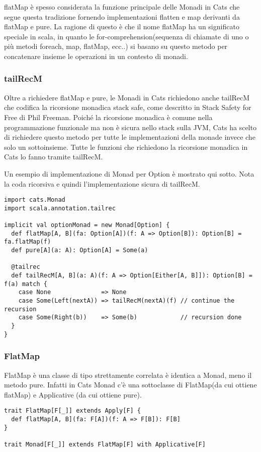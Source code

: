 \noindent flatMap è spesso considerata la funzione principale delle Monadi in Cats che segue questa tradizione fornendo implementazioni flatten e map derivanti da flatMap e pure. La ragione di questo è che il nome flatMap ha un significato speciale in scala, in quanto le for-comprehension(sequenza di chiamate di uno o più metodi foreach, map, flatMap, ecc..) si basano su questo metodo per concatenare insieme le operazioni in un contesto di monadi.

\subsubsection{tailRecM}
Oltre a richiedere flatMap e pure, le Monadi in Cats richiedono anche tailRecM che codifica la ricorsione monadica stack safe, come descritto in Stack Safety for Free di Phil Freeman. Poiché la ricorsione monadica è comune nella programmazione funzionale ma non è sicura nello stack sulla JVM, Cats ha scelto di richiedere questo metodo per tutte le implementazioni della monade invece che solo un sottoinsieme. Tutte le funzioni che richiedono la ricorsione monadica in Cats lo fanno tramite tailRecM.

Un esempio di implementazione di Monad per Option è mostrato qui sotto. Nota la coda ricorsiva e quindi l'implementazione sicura di tailRecM.
\begin{verbatim}
import cats.Monad
import scala.annotation.tailrec

implicit val optionMonad = new Monad[Option] {
  def flatMap[A, B](fa: Option[A])(f: A => Option[B]): Option[B] = fa.flatMap(f)
  def pure[A](a: A): Option[A] = Some(a)

  @tailrec
  def tailRecM[A, B](a: A)(f: A => Option[Either[A, B]]): Option[B] = f(a) match {
    case None              => None
    case Some(Left(nextA)) => tailRecM(nextA)(f) // continue the recursion
    case Some(Right(b))    => Some(b)            // recursion done
  }
}
\end{verbatim}

\subsubsection{FlatMap}

FlatMap è una classe di tipo strettamente correlata è identica a Monad, meno il metodo pure. Infatti in Cats Monad c'è una sottoclasse di FlatMap(da cui ottiene flatMap) e Applicative (da cui ottiene pure).
\begin{verbatim}
trait FlatMap[F[_]] extends Apply[F] {
  def flatMap[A, B](fa: F[A])(f: A => F[B]): F[B]
}

trait Monad[F[_]] extends FlatMap[F] with Applicative[F]
\end{verbatim}

